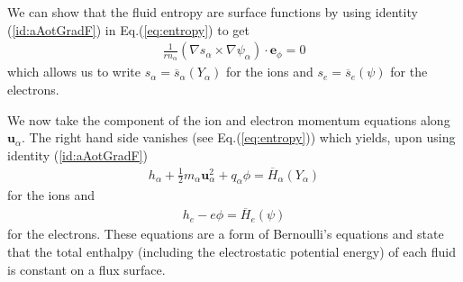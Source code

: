 \documentclass[11pt, reqno]{amsart}
\newcommand{\eqr}[1]{Eq.\thinspace(#1)}
\newcommand{\mvec}[1]{\mathbf{#1}}
\newcommand{\eep}{\mvec{e}_\phi}
\theoremstyle{definition}
\begin{document}
We can show that the fluid entropy are surface functions by using
identity ({\ref{id:aAotGradF}}) in \eqr{\ref{eq:entropy}} to get
\begin{align}
   \frac{1}{r n_\alpha} 
   (\nabla s_\alpha \times \nabla \psi_\alpha)\cdot\eep = 0
\end{align}
which allows us to write $s_\alpha = \overline{s}_\alpha(Y_\alpha)$
for the ions and $s_e = \overline{s}_e(\psi)$ for the electrons.

We now take the component of the ion and electron momentum equations
along $\mvec{u}_\alpha$. The right hand side vanishes (see
\eqr{\ref{eq:entropy}}) which yields, upon using identity
({\ref{id:aAotGradF}})
\begin{align}
  h_\alpha + \frac{1}{2}m_\alpha \mvec{u}_\alpha^2 + q_\alpha\phi
  =
  \overline{H}_\alpha(Y_\alpha)
\end{align}
for the ions and
\begin{align}
  h_e - e\phi
  =
  \overline{H}_e(\psi)
\end{align}
for the electrons. These equations are a form of Bernoulli's equations
and state that the total enthalpy (including the electrostatic
potential energy) of each fluid is constant on a flux surface.
\end{document}
